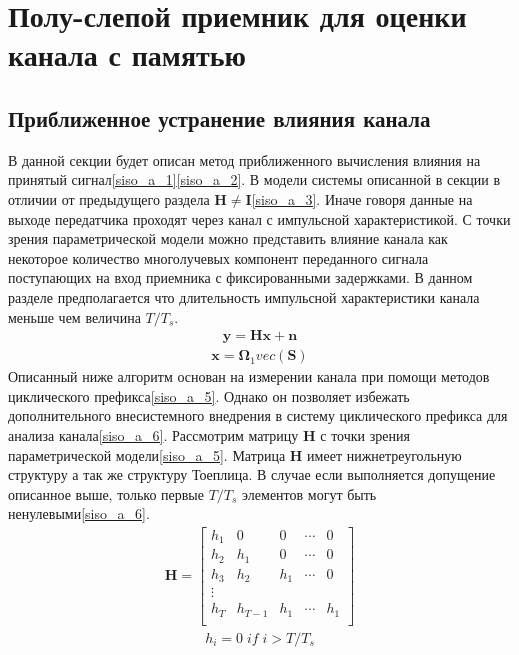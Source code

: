 \section{Полу-слепой приемник для оценки канала с памятью}
\subsection{Приближенное устранение влияния канала}
В данной секции будет описан метод приближенного вычисления влияния на принятый сигнал\eqref{siso_a_1}\eqref{siso_a_2}. В модели системы описанной в секции в отличии от предыдущего раздела $\mathbf{H}\neq \mathbf{I}$\eqref{siso_a_3}\cite{Book5}. Иначе говоря данные на выходе передатчика проходят через канал с импульсной характеристикой. С точки зрения параметрической модели можно представить влияние канала как некоторое количество многолучевых компонент переданного сигнала поступающих на вход приемника с фиксированными задержками\cite{}. В данном разделе предполагается что длительность импульсной характеристики канала меньше чем величина $T/T_s$. 
\begin{align}
\mathbf{y}=\mathbf{Hx}+\mathbf{n}\label{siso_a_1}
\end{align}
\begin{align}
\mathbf{x}=\mathbf{\Omega}_1vec(\mathbf{S}) \label{siso_a_2}
\end{align}
Описанный ниже алгоритм основан на измерении канала при помощи методов циклического префикса\eqref{siso_a_5}. Однако он позволяет избежать дополнительного внесистемного внедрения в систему циклического префикса для анализа канала\eqref{siso_a_6}. Рассмотрим матрицу $\mathbf{H}$ с точки  зрения параметрической модели\eqref{siso_a_5}. Матрица $\mathbf{H}$ имеет нижнетреугольную структуру а так же структуру Тоеплица\cite{Book27}. В случае если выполняется допущение описанное выше, только первые  $T/T_s$ элементов могут быть ненулевыми\eqref{siso_a_6}.
\begin{align}
\mathbf{H}=\begin{bmatrix}
h_{1}&0&0&\cdots &0\\
h_{2}&h_{1}&0&\cdots &0\\
h_{3}&h_{2}&h_{1}&\cdots &0\\
\vdots\\
h_{T}&h_{T-1}&h_{1}&\cdots &h_{1}\\
\end{bmatrix}\label{siso_a_3}
\end{align}
\begin{align}
h_{i}= 0 \; if \; i>T/T_s \label{siso_a_4}
\end{align}
